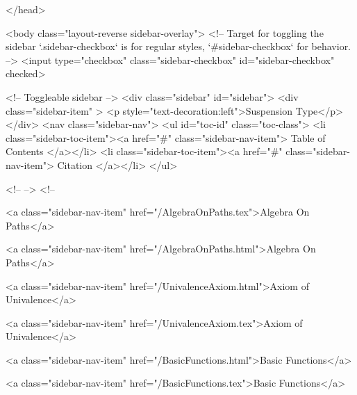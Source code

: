   
</head>




  <body class="layout-reverse sidebar-overlay">
    <!-- Target for toggling the sidebar `.sidebar-checkbox` is for regular
     styles, `#sidebar-checkbox` for behavior. -->
<input type="checkbox" class="sidebar-checkbox" id="sidebar-checkbox" checked>

<!-- Toggleable sidebar -->
<div class="sidebar" id="sidebar">
  <div class="sidebar-item" >
    <p style="text-decoration:left">Suspension Type</p>
  </div>
  <nav class="sidebar-nav">
    <ul id="toc-id" class="toc-class">
  <li class="sidebar-toc-item"><a href="#" class="sidebar-nav-item"> Table of Contents </a></li>
  <li class="sidebar-toc-item"><a href="#" class="sidebar-nav-item"> Citation </a></li>
</ul>


    <!--  -->
    <!-- 
      
    
      
    
      
    
      
        
      
    
      
        
          <a class="sidebar-nav-item" href="/AlgebraOnPaths.tex">Algebra On Paths</a>
        
      
    
      
        
          <a class="sidebar-nav-item" href="/AlgebraOnPaths.html">Algebra On Paths</a>
        
      
    
      
        
          <a class="sidebar-nav-item" href="/UnivalenceAxiom.html">Axiom of Univalence</a>
        
      
    
      
        
          <a class="sidebar-nav-item" href="/UnivalenceAxiom.tex">Axiom of Univalence</a>
        
      
    
      
        
          <a class="sidebar-nav-item" href="/BasicFunctions.html">Basic Functions</a>
        
      
    
      
        
          <a class="sidebar-nav-item" href="/BasicFunctions.tex">Basic Functions</a>
        
      
    
